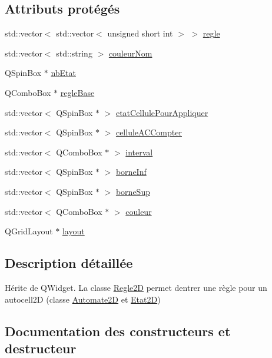 \subsection*{Attributs protégés}
\begin{DoxyCompactItemize}
\item 
std\+::vector$<$ std\+::vector$<$ unsigned short int $>$ $>$ \hyperlink{class_regle2_d_adaa6396d86c6f21c6bf7ae5ba4346dde}{regle}
\item 
std\+::vector$<$ std\+::string $>$ \hyperlink{class_regle2_d_aece48b7d62d4dc0ebfc8fd7334e7d9be}{couleur\+Nom}
\item 
Q\+Spin\+Box $\ast$ \hyperlink{class_regle2_d_a2a2964b8223ff47e483f0703c482526a}{nb\+Etat}
\item 
Q\+Combo\+Box $\ast$ \hyperlink{class_regle2_d_ae544919d03302b0ecd7bfacfc2842ccf}{regle\+Base}
\item 
std\+::vector$<$ Q\+Spin\+Box $\ast$ $>$ \hyperlink{class_regle2_d_aa5356ff562ccfe9828275effb8866fa9}{etat\+Cellule\+Pour\+Appliquer}
\item 
std\+::vector$<$ Q\+Spin\+Box $\ast$ $>$ \hyperlink{class_regle2_d_aff3f269a5118bda47bcdf133d26010e6}{cellule\+A\+C\+Compter}
\item 
std\+::vector$<$ Q\+Combo\+Box $\ast$ $>$ \hyperlink{class_regle2_d_a528a7cfc33a1be6540177b67e270c157}{interval}
\item 
std\+::vector$<$ Q\+Spin\+Box $\ast$ $>$ \hyperlink{class_regle2_d_a1b15542eb7bc7b32dc9c1cc615089eab}{borne\+Inf}
\item 
std\+::vector$<$ Q\+Spin\+Box $\ast$ $>$ \hyperlink{class_regle2_d_a206e0c9c6f0710e98326e438affb2134}{borne\+Sup}
\item 
std\+::vector$<$ Q\+Combo\+Box $\ast$ $>$ \hyperlink{class_regle2_d_a57b848611ac63837d30790b5ddec9299}{couleur}
\item 
Q\+Grid\+Layout $\ast$ \hyperlink{class_regle2_d_a344f417a81ffccf34760808b3969d25e}{layout}
\end{DoxyCompactItemize}


\subsection{Description détaillée}
Hérite de Q\+Widget. La classe \hyperlink{class_regle2_d}{Regle2D} permet d\textquotesingle{}entrer une règle pour un autocell2D (classe \hyperlink{class_automate2_d}{Automate2D} et \hyperlink{class_etat2_d}{Etat2D}) 

\subsection{Documentation des constructeurs et destructeur}
